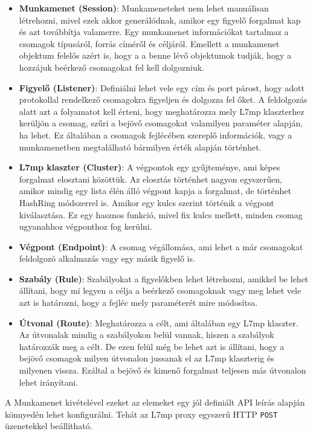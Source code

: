 \begin{itemize}
	\item \textbf{Munkamenet (Session)}: Munkameneteket nem lehet manuálisan létrehozni,
	mivel ezek akkor generálódnak, amikor egy figyelő forgalmat kap és azt 
	továbbítja valamerre. Egy munkamenet információkat tartalmaz a csomagok típusáról,
	forrás címéről és céljáról. Emellett a munkamenet objektum felelős azért is, hogy a
	a benne lévő objektumok tudják, hogy a hozzájuk beérkező csomagokat fel kell 
	dolgozniuk. 
	\item \textbf{Figyelő (Listener)}: Definiálni lehet vele egy cím és port párost, hogy
	adott protokollal rendelkező csomagokra figyeljen és dolgozza fel őket. A feldolgozás
	alatt azt a folyamatot kell érteni, hogy meghatározza mely L7mp klaszterhez kerüljön 
	a csomag, szűri a bejövő csomagokat valamilyen paraméter alapján, ha lehet. Ez 
	általában a csomagok fejlécében szereplő információk, vagy a munkamenetben 
	megtalálható bármilyen érték alapján történhet. 
	\item \textbf{L7mp klaszter (Cluster)}: A végpontok egy gyűjteménye, ami képes 
	forgalmat elosztani közöttük. Az elosztás történhet nagyon egyszerűen, amikor mindig 
	egy lista élén álló végpont kapja a forgalmat, de történhet HashRing módszerrel is. 
	Amikor egy kulcs szerint történik a végpont kiválasztása. Ez egy hasznos funkció, 
	mivel fix kulcs mellett, minden csomag ugyanahhoz végponthoz fog kerülni. 
	\item \textbf{Végpont (Endpoint)}: A csomag végállomása, ami lehet a már csomagokat
	feldolgozó alkalmazás vagy egy másik figyelő is.
	\item \textbf{Szabály (Rule)}: Szabályokat a figyelőkben lehet létrehozni, amikkel
	be lehet állítani, hogy mi legyen a célja a beérkező csomagoknak vagy meg lehet vele 
	azt is határozni, hogy a fejléc mely paraméterét mire módosítsa. 
	\item \textbf{Útvonal (Route)}: Meghatározza a célt, ami általában egy L7mp klaszter. 
	Az útvonalak mindig a szabályokon belül vannak, hiszen a szabályok határozzák meg a 
	célt. De ezen felül még be lehet azt is állítani, hogy a bejövő csomagok milyen 
	útvonalon jussanak el az L7mp klaszterig és milyenen vissza. Ezáltal a bejövő és 
	kimenő forgalmat teljesen más útvonalon lehet irányítani.
\end{itemize}

A Munkamenet kivételével ezeket az elemeket egy jól definiált API leírás alapján 
könnyedén lehet konfigurálni. Tehát az L7mp proxy egyszerű HTTP \texttt{POST} üzenetekkel 
beállítható.

